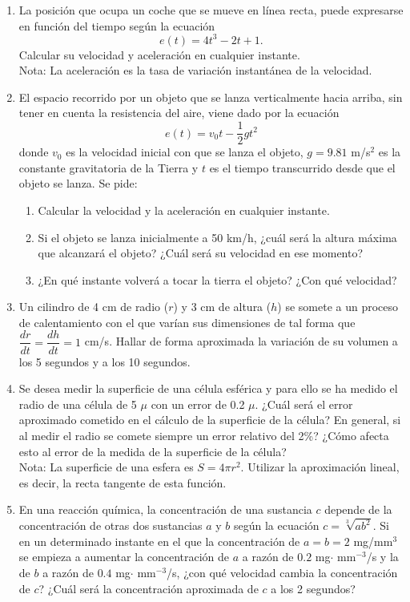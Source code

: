 \documentclass[a4paper,titlepage]{article}
\theoremstyle{solution}
\begin{document}
\begin{enumerate}[leftmargin=*]
\item La posición que ocupa un coche que se mueve en línea recta, puede expresarse en función del tiempo según la ecuación
\[
e(t) = 4t^3 -2t +1.
\]
Calcular su velocidad y aceleración en cualquier instante.\\
Nota: La aceleración es la tasa de variación instantánea de la velocidad.  

\item El espacio recorrido por un objeto que se lanza verticalmente hacia arriba, sin tener en cuenta la resistencia del aire, viene dado por la ecuación 
\[
e(t) =v_0t-\frac{1}{2}gt^2
\]
donde $v_0$ es la velocidad inicial con que se lanza el objeto, $g=9.81$ m/s$^2$ es la constante gravitatoria de la Tierra y $t$ es el tiempo transcurrido desde que el objeto se lanza. 
Se pide:
\begin{enumerate} 
\item Calcular la velocidad y la aceleración en cualquier instante. 
\item Si el objeto se lanza inicialmente a 50 km/h, ¿cuál será la altura máxima que alcanzará el objeto? ¿Cuál será su velocidad en ese
momento?
\item ¿En qué instante volverá a tocar la tierra el objeto? ¿Con qué velocidad?
\end{enumerate} 

\item Un cilindro de 4 cm de radio ($r$) y 3 cm de altura ($h$) se somete a un proceso de calentamiento con el que varían sus dimensiones de tal forma que $\dfrac{dr}{dt}=\dfrac{dh}{dt}= 1$ cm/s. Hallar de forma aproximada la variación de su volumen a los 5 segundos y a los 10 segundos.

\item Se desea medir la superficie de una célula esférica y para ello se ha medido el radio de una célula de 5 $\mu$ con un error de 0.2 $\mu$.
¿Cuál será el error aproximado cometido en el cálculo de la superficie de la célula? 
En general, si al medir el radio se comete siempre un error relativo del 2\%? ¿Cómo afecta esto al error de la medida de la superficie de la célula?\\
Nota: La superficie de una esfera es $S=4\pi r^2$. Utilizar la aproximación lineal, es decir, la recta tangente de esta función.

\item En una reacción química, la concentración de una sustancia $c$ depende de la concentración de otras dos sustancias $a$ y $b$
según la ecuación $c=\sqrt[3]{ab^2}$.
Si en un determinado instante en el que la concentración de $a=b=2$ mg/mm$^3$ se empieza a aumentar la concentración de $a$ a razón de $0.2$ mg$\cdot$ mm$^{-3}$/s y la de $b$ a razón de $0.4$ mg$\cdot$ mm$^{-3}$/s, ¿con qué velocidad cambia la concentración de $c$?
¿Cuál será la concentración aproximada de $c$ a los 2 segundos?


\end{enumerate}
\end{document}
